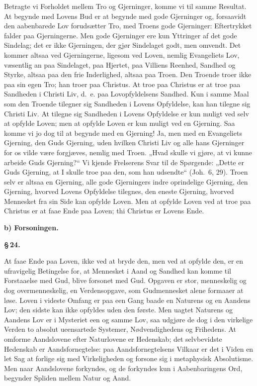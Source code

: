 \documentclass[12pt]{book}
\newcommand{\parmark}[1]{\begin{center}{\bfseries \S\,#1.}\end{center}}
\newcommand{\runhead}[1]{%
  \medskip\begin{center}{\bfseries #1}\end{center}\medskip}
\begin{document}
Betragte vi Forholdet mellem Tro og Gjerninger, komme vi til samme
Resultat. At begynde med Lovens Bud er at begynde med gode
Gjerninger og, forsaavidt den aabenbarede Lov forudsætter Tro, med
Troens gode Gjerninger: Eftertrykket falder paa Gjerningerne. Men
gode Gjerninger ere kun Yttringer af det gode Sindelag; det er ikke
Gjerningen, der gjør Sindelaget godt, men omvendt. Det kommer altsaa
ved Gjerningerne, ligesom ved Loven, nemlig Evangeliets Lov,
væsentlig an paa Sindelaget, paa Hjertet, paa Villiens Reenhed,
Sandhed og Styrke, altsaa paa den frie Inderlighed, altsaa paa
Troen. Den Troende troer ikke paa sin egen Tro; han troer paa
Christus. At troe paa Christus er at troe paa Sandheden i Christi
Liv, d.\ e. paa Lovopfyldelsens Sandhed. Kun i samme Maal som den
Troende tilegner sig Sandheden i Lovens Opfyldelse, kan han tilegne
sig Christi Liv. At tilegne sig Sandheden i Lovens Opfyldelse er kun
muligt ved selv at opfylde Loven; men at opfylde Loven er kun muligt
ved en Gjerning. Saa komme vi jo dog til at begynde med en Gjerning!
Ja, men med en Evangeliets Gjerning, den Guds Gjerning, uden hvilken
Christi Liv og alle hans Gjerninger for os vilde være forgjæves,
nemlig med Troen. „Hvad skulle vi gjøre, at vi kunne arbeide Guds
Gjerning?“ Vi kjende Frelserens Svar til de Spørgende: „Dette er
Guds Gjerning, at I skulle troe paa den, som han udsendte“
(Joh.\ 6, 29). Troen selv er altsaa en Gjerning, alle gode
Gjerningers indre oprindelige Gjerning, den Gjerning, hvorved Lovens
Opfyldelse tilegnes, den eneste Gjerning, hvorved Mennesket fra sin
Side kan opfylde Loven. Men at opfylde Loven ved at troe paa
Christus er at faae Ende paa Loven; thi Christus er Lovens Ende.

\runhead{b) Forsoningen.}
\parmark{24}

At faae Ende paa Loven, ikke ved at bryde den, men ved at opfylde
den, er en ufravigelig Betingelse for, at Mennesket i Aand og
Sandhed kan komme til Forstaaelse med Gud, blive forsonet med Gud.
Opgaven er stor, menneskelig og dog overmenneskelig, en
Verdensopgave, som Gudmennesket alene formaaer at løse. Loven i
videste Omfang er paa een Gang baade en Naturens og en Aandens Lov;
den sidste kan ikke opfyldes uden den første. Men uagtet Naturens og
Aandens Lov er i Mysteriet een og samme Lov, saa udgjøre de dog i
den virkelige Verden to absolut ueensartede Systemer,
Nødvendighedens og Frihedens. At omforme Aandslovene efter
Naturlovene er Hedenskab; det selvbevidste Hedenskab er
Aandsfornegtelse: paa Aandsfornegtelsens Vilkaar er det i Viden en
let Sag at forlige sig med Virkeligheden og forsone sig i
metaphysisk Absolutisme. Men naar Aandslovene forkyndes, og de
forkyndes kun i Aabenbaringens Ord, begynder Spliden mellem Natur og
Aand.
\end{document}
